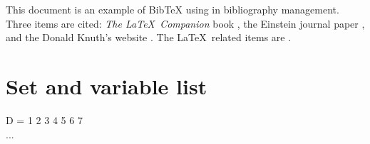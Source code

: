\documentclass[a4paper, 10pt, twoside, openright]{book}
\begin{document}
This document is an example of BibTeX using in bibliography management. Three items are cited: \textit{The \LaTeX\ Companion} book \cite{latexcompanion}, the Einstein journal paper \cite{einstein}, and the Donald Knuth's website \cite{knuthwebsite}. The \LaTeX\ related items are \cite{latexcompanion,knuthwebsite}.





%








\appendix
\chapter{Set and variable list} \label{sets and variables}
D = 1 2 3 4 5 6 7 \\
...
\end{document}
